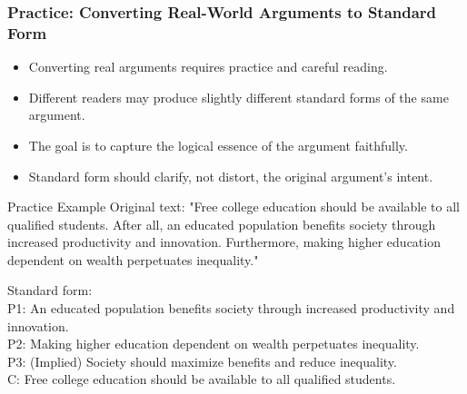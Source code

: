\documentclass{beamer}
\begin{document}
\begin{frame}
    \frametitle{Practice: Converting Real-World Arguments to Standard Form}
    \begin{itemize}
        \item Converting real arguments requires practice and careful reading.
        \item Different readers may produce slightly different standard forms of the same argument.
        \item The goal is to capture the logical essence of the argument faithfully.
        \item Standard form should clarify, not distort, the original argument's intent.
    \end{itemize}
    
    \begin{exampleblock}{Practice Example}
    \scriptsize
        Original text: "Free college education should be available to all qualified students. After all, an educated population benefits society through increased productivity and innovation. Furthermore, making higher education dependent on wealth perpetuates inequality."
        
        Standard form:\\
        P1: An educated population benefits society through increased productivity and innovation.\\
        P2: Making higher education dependent on wealth perpetuates inequality.\\
        P3: (Implied) Society should maximize benefits and reduce inequality.\\
        C: Free college education should be available to all qualified students.
    \end{exampleblock}
\end{frame}
\end{document}
